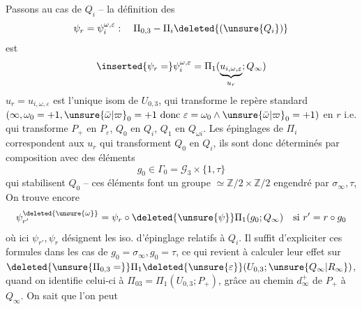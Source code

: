 Passons au cas de $Q_i$ -- la définition   des
\[
\psi_r=\psi_i^{\omega,\varepsilon}:\quad\Pi_{0,3}-\Pi_i\deleted{(\unsure{Q_i})}
\]
est
\[
\inserted{\psi_r=}\psi_i^{\omega,\varepsilon}=\Pi_1(\underbrace{u_{i,\omega,\varepsilon}}_{u_r};Q_\infty)
\]
 $u_r=u_{i,\omega,\varepsilon}$ est l'unique isom de $U_{0,3}$,  qui transforme le repère  standard $(\infty,\omega_0=+1,\unsure{\bar\omega|\varpi}_0=+1\text{ donc }\varepsilon=\omega_0\wedge\unsure{\bar\omega|\varpi}_0=+1)$ en $r$ i.e. qui transforme $P_+$ en $P_\varepsilon$, $Q_0$ en $Q_i$, $Q_1$ en $Q_{\omega i}$.  Les épinglages  de $\Pi_i$  correspondent aux $u_r$ qui transforment $Q_0$ en $Q_i$, ils sont donc déterminés par composition avec des éléments
\[
g_0\in\Gamma_0=\mathcal G_3\times\{1,\tau\}
\]
qui stabilisent $Q_0$ -- ces éléments  font un groupe $\simeq\mathbb Z/2\times\mathbb Z/2$ engendré par $\sigma_\infty,\tau$,  On trouve encore
\[
\psi_{r'}^{\deleted{\unsure{\omega}}}=\psi_r\circ\deleted{\unsure{\psi}}\Pi_1(g_0;Q_\infty)\quad\text{si }r'=r\circ g_0
\]
où ici $\psi_{r'},\psi_r$ désignent les iso. d'épinglage relatifs à $Q_i$. Il suffit d'expliciter ces formules dans les cas de $g_0=\sigma_\infty,g_0=\tau$, ce qui revient à calculer leur effet sur $\deleted{\unsure{\Pi_{0,3}=}}\Pi_1\deleted{\unsure{\varepsilon}}(U_{0,3};\unsure{Q_\infty|R_\infty})$, quand on identifie celui-ci à $\Pi_{03}=\Pi_1(U_{0,3};P_+)$, grâce au chemin $d_\infty^+$ de $P_+$ à $Q_\infty$. On sait que l'on peut

